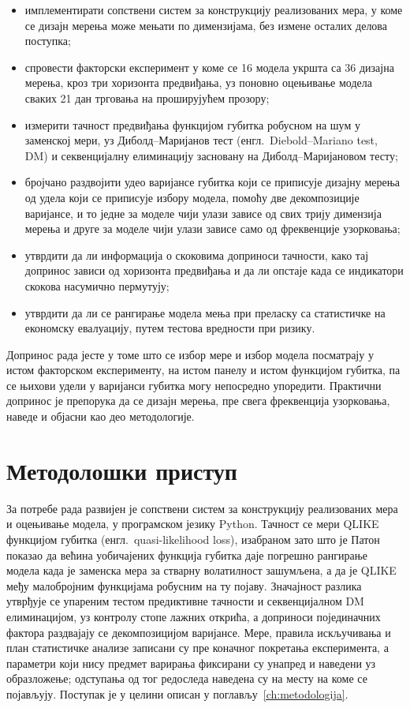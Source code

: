 \begin{itemize}
\item имплементирати сопствени систем за конструкцију реализованих мера, у коме се
      дизајн мерења може мењати по димензијама, без измене осталих делова поступка;
\item спровести факторски експеримент у коме се 16 модела укршта са
      36 дизајна мерења, кроз три хоризонта предвиђања, уз поновно оцењивање модела
      сваких 21 дан трговања на проширујућем прозору;
\item измерити тачност предвиђања функцијом губитка робусном на шум у заменској мери,
      уз Диболд–Маријанов тест (енгл.\ Diebold--Mariano test, DM) и секвенцијалну
      елиминацију засновану на Диболд–Маријановом тесту;
\item бројчано раздвојити удео варијансе губитка који се приписује дизајну мерења од
      удела који се приписује избору модела, помоћу две декомпозиције варијансе, и то
      једне за моделе чији улази зависе од свих трију димензија мерења и друге за
      моделе чији улази зависе само од фреквенције узорковања;
\item утврдити да ли информација о скоковима доприноси тачности, како тај допринос
      зависи од хоризонта предвиђања и да ли опстаје када се индикатори скокова
      насумично пермутују;
\item утврдити да ли се рангирање модела мења при преласку са статистичке на економску
      евалуацију, путем тестова вредности при ризику.
\end{itemize}

Допринос рада јесте у томе што се избор мере и избор модела посматрају у истом
факторском експерименту, на истом панелу и истом функцијом губитка, па се њихови удели у
варијанси губитка могу непосредно упоредити. Практични допринос је препорука да се
дизајн мерења, пре свега фреквенција узорковања, наведе и објасни као део методологије.

\section{Методолошки приступ}

За потребе рада развијен је сопствени систем за конструкцију реализованих мера и
оцењивање модела, у програмском језику Python. Тачност се мери QLIKE функцијом губитка (енгл.\ quasi-likelihood
loss),
изабраном зато што је Патон \parencite{patton2011} показао да већина уобичајених
функција губитка даје погрешно рангирање модела када је заменска мера за стварну
волатилност зашумљена, а да је QLIKE међу малобројним функцијама робусним на ту појаву. Значајност
разлика утврђује се упареним тестом предиктивне тачности и секвенцијалном DM елиминацијом, уз
контролу стопе лажних открића, а доприноси појединачних фактора раздвајају се
декомпозицијом варијансе. Мере, правила искључивања и план статистичке анализе
записани су пре коначног покретања експеримента, а параметри који нису предмет
варирања фиксирани су унапред и наведени уз образложење; одступања од тог редоследа
наведена су на месту на коме се појављују. Поступак је у целини описан у
поглављу~\ref{ch:metodologija}.

